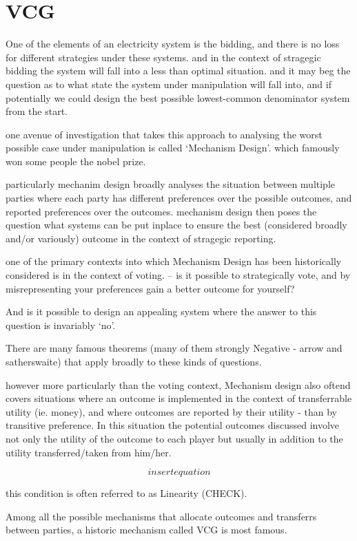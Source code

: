 \documentclass{article}
\begin{document}
\section{VCG}

One of the elements of an electricity system is the bidding, and there is no loss for different strategies under these systems.
and in the context of stragegic bidding the system will fall into a less than optimal situation.
and it may beg the question as to what state the system under manipulation will fall into, and if potentially we could design the best possible lowest-common denominator system from the start.

one avenue of investigation that takes this approach to analysing the worst possible case under manipulation is called `Mechanism Design'.
which famously won some people the nobel prize.

particularly mechanim design broadly analyses the situation between multiple parties where each party has different preferences over the possible outcomes, and reported preferences over the outcomes.
mechanism design then poses the question what systems can be put inplace to ensure the best (considered broadly and/or variously) outcome in the context of stragegic reporting.

one of the primary contexts into which Mechanism Design has been historically considered is in the context of voting. -- is it possible to strategically vote, and by misrepresenting your preferences gain a better outcome for yourself?

And is it possible to design an appealing system where the answer to this question is invariably `no'.

There are many famous theorems (many of them strongly Negative - arrow and satherswaite) that apply broadly to these kinds of questions.

however more particularly than the voting context, Mechanism design also oftend covers situations where an outcome is implemented in the context of transferrable utility (ie. money), and where outcomes are reported by their utility - than by transitive preference.
In this situation the potential outcomes discussed involve not only the utility of the outcome to each player but usually in addition to the utility transferred/taken from him/her.

$$insert equation$$

this condition is often referred to as Linearity (CHECK).

Among all the possible mechanisms that allocate outcomes and transferrs between parties, a historic mechanism called VCG is most famous.
\end{document}
